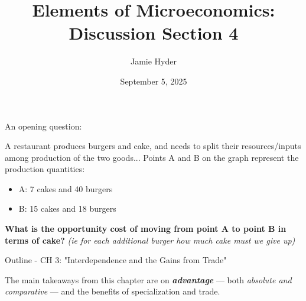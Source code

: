 \documentclass[compress]{beamer}
\title{Elements of Microeconomics: \\
       Discussion Section 4}
\author{Jamie Hyder}
\date{September 5, 2025}
\begin{document}
\begin{frame}
  \titlepage
\end{frame}

\begin{frame}{An opening question:}

\centering
{}


\begin{block}{A restaurant produces burgers and cake, and needs to split their resources/inputs among production of the two goods...}
Points A and B on the graph represent the production quantities:
    \begin{itemize}
        \item A: 7 cakes and 40 burgers
        \item B: 15 cakes and 18 burgers
    \end{itemize}
\textbf{What is the opportunity cost of moving from point A to point B in terms of cake?}\textit{ (ie for each additional burger how much cake must we give up)}
\end{block}

\end{frame}    



\begin{frame}{Outline - CH 3: "Interdependence and the Gains from Trade"}

    The main takeaways from this chapter are on \textbf{\textit{advantage}} --- both \textit{absolute and comparative} --- and the benefits of specialization and trade.
\end{frame}
\end{document}
